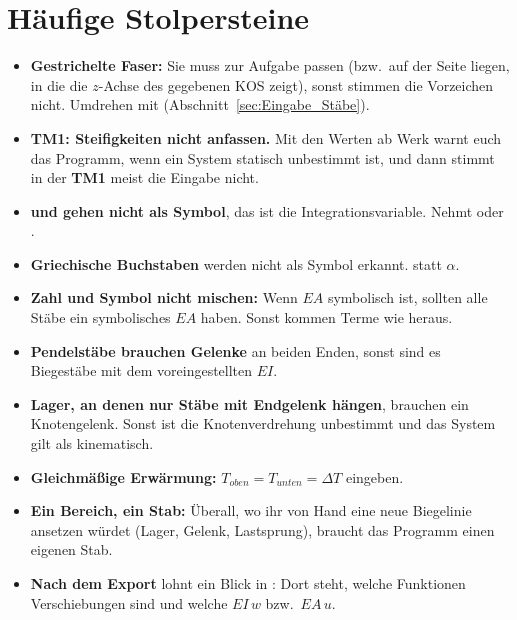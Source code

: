 \section{Häufige Stolpersteine}

\begin{itemize}
  \item \textbf{Gestrichelte Faser:} Sie muss zur Aufgabe passen (bzw.\ auf der Seite liegen, in die
        die $z$-Achse des gegebenen KOS zeigt), sonst stimmen die Vorzeichen nicht. Umdrehen mit
         (Abschnitt~\ref{sec:Eingabe_Stäbe}).
  \item \textbf{TM1: Steifigkeiten nicht anfassen.} Mit den Werten ab Werk warnt euch das Programm,
        wenn ein System statisch unbestimmt ist, und dann stimmt in der \textbf{TM1} meist die
        Eingabe nicht.
  \item \textbf{ und  gehen nicht als Symbol}, das ist die Integrationsvariable.
        Nehmt  oder .
  \item \textbf{Griechische Buchstaben} werden nicht als Symbol erkannt.  statt $\alpha$.
  \item \textbf{Zahl und Symbol nicht mischen:} Wenn $EA$ symbolisch ist, sollten alle Stäbe ein
        symbolisches $EA$ haben. Sonst kommen Terme wie  heraus.
  \item \textbf{Pendelstäbe brauchen Gelenke} an beiden Enden, sonst sind es Biegestäbe mit dem
        voreingestellten $EI$.
  \item \textbf{Lager, an denen nur Stäbe mit Endgelenk hängen}, brauchen ein Knotengelenk. Sonst
        ist die Knotenverdrehung unbestimmt und das System gilt als kinematisch.
  \item \textbf{Gleichmäßige Erwärmung:} $T_{oben} = T_{unten} = \Delta T$ eingeben.
  \item \textbf{Ein Bereich, ein Stab:} Überall, wo ihr von Hand eine neue Biegelinie ansetzen
        würdet (Lager, Gelenk, Lastsprung), braucht das Programm einen eigenen Stab.
  \item \textbf{Nach dem Export} lohnt ein Blick in : Dort steht, welche Funktionen
        Verschiebungen sind und welche $EI\,w$ bzw.\ $EA\,u$.
\end{itemize}



